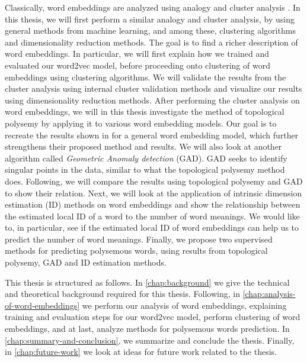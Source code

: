 Classically, word embeddings are analyzed using analogy and cluster analysis \cite{mikolov2013a,mikolov2013b,walkowiak-gniewkowski-2019-evaluation}. In this thesis, we will first perform a similar analogy and cluster analysis, by using general methods from machine learning, and among these, clustering algorithms and dimensionality reduction methods. The goal is to find a richer description of word embeddings. In particular, we will first explain how we trained and evaluated our word2vec model, before proceeding onto clustering of word embeddings using clustering algorithms. We will validate the results from the cluster analysis using internal cluster validation methods and visualize our results using dimensionality reduction methods. After performing the cluster analysis on word embeddings, we will in this thesis investigate the method of topological polysemy by applying it to various word embedding models. Our goal is to recreate the results shown in \cite{jakubowski2020topology} for a general word embedding model, which further strengthens their proposed method and results. We will also look at another algorithm called \textit{Geometric Anomaly detection} (GAD). GAD seeks to identify singular points in the data, similar to what the topological polysemy method does. Following, we will compare the results using topological polysemy and GAD to show their relation. Next, we will look at the application of intrinsic dimension estimation (ID) methods on word embeddings and show the relationship between the estimated local ID of a word to the number of word meanings. We would like to, in particular, see if the estimated local ID of word embeddings can help us to predict the number of word meanings. Finally, we propose two supervised methods for predicting polysemous words, using results from topological polysemy, GAD and ID estimation methods.

This thesis is structured as follows. In \cref{chap:background} we give the technical and theoretical background required for this thesis. Following, in \cref{chap:analysis-of-word-embeddings} we perform our analysis of word embeddings, explaining training and evaluation steps for our word2vec model, perform clustering of word embeddings, and at last, analyze methods for polysemous words prediction. In \cref{chap:summary-and-conclusion}, we summarize and conclude the thesis. Finally, in \cref{chap:future-work} we look at ideas for future work related to the thesis.